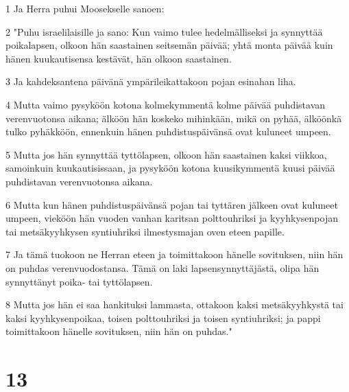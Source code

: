 \par 1 Ja Herra puhui Moosekselle sanoen:
\par 2 "Puhu israelilaisille ja sano: Kun vaimo tulee hedelmälliseksi ja synnyttää poikalapsen, olkoon hän saastainen seitsemän päivää; yhtä monta päivää kuin hänen kuukautisensa kestävät, hän olkoon saastainen.
\par 3 Ja kahdeksantena päivänä ympärileikattakoon pojan esinahan liha.
\par 4 Mutta vaimo pysyköön kotona kolmekymmentä kolme päivää puhdistavan verenvuotonsa aikana; älköön hän koskeko mihinkään, mikä on pyhää, älköönkä tulko pyhäkköön, ennenkuin hänen puhdistuspäivänsä ovat kuluneet umpeen.
\par 5 Mutta jos hän synnyttää tyttölapsen, olkoon hän saastainen kaksi viikkoa, samoinkuin kuukautisissaan, ja pysyköön kotona kuusikymmentä kuusi päivää puhdistavan verenvuotonsa aikana.
\par 6 Mutta kun hänen puhdistuspäivänsä pojan tai tyttären jälkeen ovat kuluneet umpeen, vieköön hän vuoden vanhan karitsan polttouhriksi ja kyyhkysenpojan tai metsäkyyhkysen syntiuhriksi ilmestysmajan oven eteen papille.
\par 7 Ja tämä tuokoon ne Herran eteen ja toimittakoon hänelle sovituksen, niin hän on puhdas verenvuodostansa. Tämä on laki lapsensynnyttäjästä, olipa hän synnyttänyt poika- tai tyttölapsen.
\par 8 Mutta jos hän ei saa hankituksi lammasta, ottakoon kaksi metsäkyyhkystä tai kaksi kyyhkysenpoikaa, toisen polttouhriksi ja toisen syntiuhriksi; ja pappi toimittakoon hänelle sovituksen, niin hän on puhdas."

\chapter{13}

